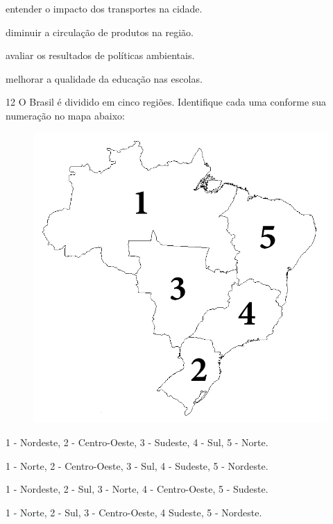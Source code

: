 \begin{escolha}
\item entender o impacto dos transportes na cidade.

\item diminuir a circulação de produtos na região.

\item avaliar os resultados de políticas ambientais.

\item melhorar a qualidade da educação nas escolas.
\end{escolha}



\pagebreak
\num{12} O Brasil é dividido em cinco regiões. Identifique cada uma conforme sua numeração no mapa abaixo:

\begin{figure}[htpb!]
\includegraphics[width=\textwidth]{../ilustracoes/CHU5/SAEB_5ANO_CHU_FIGURA1.png}
\end{figure}



\begin{escolha}
\item 1 - Nordeste, 2 - Centro-Oeste, 3 - Sudeste, 4 - Sul, 5 - Norte.

\item 1 - Norte, 2 - Centro-Oeste, 3 - Sul, 4 - Sudeste, 5 - Nordeste.

\item 1 - Nordeste, 2 - Sul, 3 - Norte, 4 - Centro-Oeste, 5 - Sudeste.

\item 1 - Norte, 2 - Sul, 3 - Centro-Oeste, 4 Sudeste, 5 - Nordeste.
\end{escolha}

